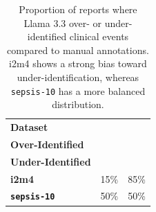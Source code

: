 \begin{table}[htbp]
\caption{Proportion of reports where Llama 3.3 over- or under-identified clinical events compared to manual annotations. i2m4 shows a strong bias toward under-identification, whereas \texttt{sepsis-10} has a more balanced distribution.}
\ChSixTableBodyStart
\begin{ChSixFloatBody}

\setlength{\tabcolsep}{4pt}
\centering
\begin{tabular}{|l|c|c|}
\hline
\textbf{Dataset} & \makecell{\textbf{\% Reports} \\ \textbf{Over-Identified}} & \makecell{\textbf{\% Reports} \\ \textbf{Under-Identified}} \\ \hline
\textbf{i2m4}    & 15\%                                & 85\%                                 \\ \hline
\textbf{\texttt{sepsis-10}} & 50\%                              & 50\%                                 \\ \hline
\end{tabular}



\end{ChSixFloatBody}
\end{table}